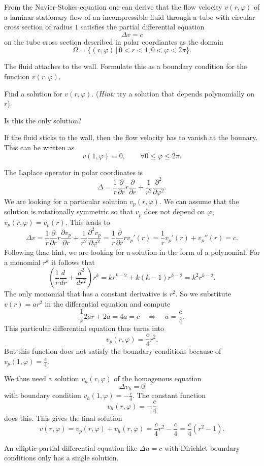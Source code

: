 From the Navier-Stokes-equation one can derive that the
flow velocity $v(r,\varphi)$ of a laminar stationary flow of an
incompressible fluid through a tube with circular cross section
of radius $1$ satisfies the partial differential equation
\[
\Delta v=c
\]
on the tube cross section described in polar coordiantes as the domain
\[
\Omega = \{ (r,\varphi)\,|\,0 < r < 1,0 < \varphi < 2\pi\}.
\]
\begin{teilaufgaben}
\item
The fluid attaches to the wall.
Formulate this as a boundary condition for the function $v(r,\varphi)$.
\item
Find a solution for $v(r,\varphi)$.
({\it Hint:} try a solution that depends polynomially on $r$).
\item
Is this the only solution?
\end{teilaufgaben}

\begin{loesung}
\begin{teilaufgaben}
\item
If the fluid sticks to the wall, then the flow velocity has to 
vanish at the bounary.
This can be written as
\[
v(1,\varphi)=0,\qquad\forall 0\le \varphi\le 2\pi.
\]
\item
The Laplace operator in polar coordinates is
\[
\Delta
=
\frac1r\frac{\partial}{\partial r}r\frac{\partial}{\partial r}
+\frac1{r^2}\frac{\partial^2}{\partial\varphi^2}.
\]
We are looking for a particular solution $v_p(r,\varphi)$.
We can assume that the solution is rotationally symmetric so that
$v_p$ does not depend on $\varphi$, 
$v_p(r,\varphi)=v_p(r)$.
This leads to
\[
\Delta v=
\frac1r\frac{\partial}{\partial r}r
\frac{\partial v_p}{\partial r}
+\frac1{r^2}\frac{\partial^2v_p}{\partial\varphi^2}
=
\frac1r\frac{\partial}{\partial r}rv_p'(r)
=
\frac1rv_p'(r)+v_p''(r)=c.
\]
Following thae hint, we are looking for a solution in the form of a
polynomial.
For a monomial $r^k$ it follows that
\[
\left(\frac1r\frac{d}{dr}+\frac{d^2}{dr^2}\right)r^k
=kr^{k-2}+k(k-1)r^{k-2}
=k^2 r^{k-2}.
\]
The only monomial that has a constant derivative is $r^2$.
So we substitute $v(r)=ar^2$ in the differential equation and compute
\[
\frac1r2ar+2a
=
4a
=c
\quad
\Rightarrow
\quad
a=\frac{c}{4}.
\]
This particular differential equation thus turns into
\[
v_p(r,\varphi)=\frac{c}{4}r^2.
\]
But this function does not satisfy the boundary conditions because of
$v_p(1,\varphi)=\frac{c}{4}$.

We thus need a solution $v_h(r,\varphi)$ of the homogenous equation
\[
\Delta v_h=0
\]
with boundary condition $v_h(1,\varphi)=-\frac{c}{4}$.
The constant function
\[
v_h(r,\varphi)=-\frac{c}{4}
\]
does this.
This gives the final solution
\[
v(r,\varphi)=v_p(r,\varphi)+v_h(r,\varphi)=\frac{c}{4}r^2 -\frac{c}{4}=
\frac{c}{4}(r^2-1).
\]
\item
An elliptic partial differential equation like
$\Delta u=c$ with Dirichlet boundary conditions only has a single 
solution.
\qedhere
\end{teilaufgaben}
\end{loesung}
